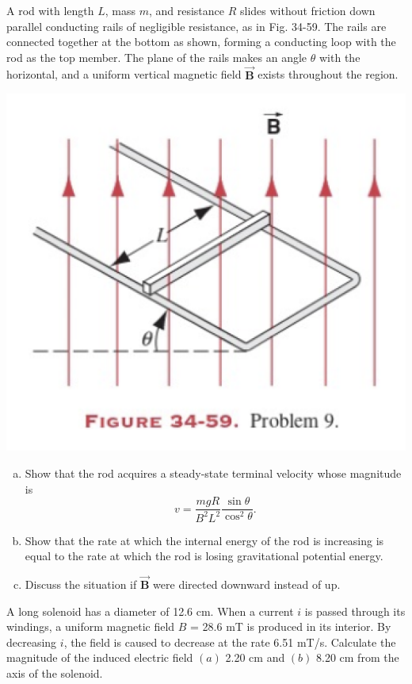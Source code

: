 \documentclass[12pt,letterpaper]{hmcpset}
\begin{document}
	\begin{problem}[34P9:]
		A rod with length $L$, mass $m$, and resistance $R$ slides without friction down parallel conducting rails of negligible resistance, as in Fig. 34-59.
		The rails are connected together at the bottom as shown, forming a conducting loop with the rod as the top member.
		The plane of the rails makes an angle $\theta$ with the horizontal, and a uniform vertical magnetic field $\vec{\mathbf{B}}$ exists throughout the region.

		\centering\includegraphics[scale = 0.4]{Fig_34-59}

		\begin{enumerate}[(a)]
		\item Show that the rod acquires a steady-state terminal velocity whose magnitude is
		\[v = \frac{mgR}{B^2L^2}\frac{\sin{\theta}}{\cos^2{\theta}}.\]
		\item Show that the rate at which the internal energy of the rod is increasing is equal to the rate at which the rod is losing gravitational potential energy.
		\item Discuss the situation if $\vec{\mathbf{B}}$ were directed downward instead of up.
		\end{enumerate}
	\end{problem}
	\clearpage



	\begin{problem}[34E30:]
		A long solenoid has a diameter of 12.6 cm.
		When a current $i$ is passed through its windings, a uniform magnetic field $B$ = 28.6 mT is produced in its interior.
		By decreasing $i$, the field is caused to decrease at the rate 6.51 mT/s.
		Calculate the magnitude of the induced electric field $(a)$ 2.20 cm and $(b)$ 8.20 cm from the axis of the solenoid.
	\end{problem}
	\clearpage
\end{document}

